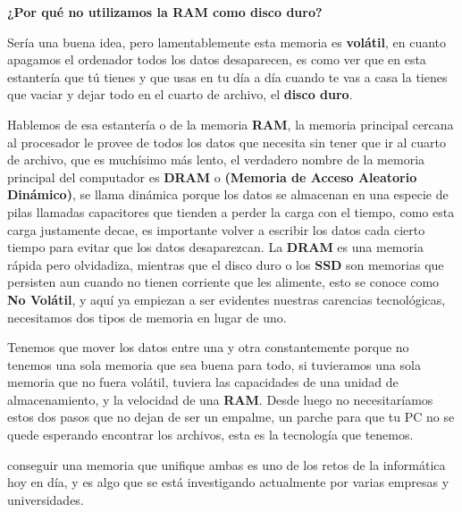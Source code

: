 \documentclass{article}
\begin{document}
\vspace{0.5cm}

\textbf{¿Por qué no utilizamos la RAM como disco duro?}

\vspace{0.5cm}

Sería una buena idea, pero lamentablemente esta memoria es \textbf{volátil}, en cuanto apagamos el ordenador todos los datos desaparecen, es como ver que en esta estantería que tú tienes y que usas en tu día a día cuando te vas a casa la tienes que vaciar y dejar todo en el cuarto de archivo, el \textbf{disco duro}.

\vspace{0.5cm}

Hablemos de esa estantería o de la memoria \textbf{RAM}, la memoria principal cercana al procesador le provee de todos los datos que necesita sin tener que ir al cuarto de archivo, que es muchísimo más lento, el verdadero nombre de la memoria principal del computador es \textbf{DRAM} o \textbf{(Memoria de Acceso Aleatorio Dinámico)}, se llama dinámica porque los datos se almacenan en una especie de pilas llamadas capacitores que tienden a perder la carga con el tiempo,\cite{uaslpwebsite} como esta carga justamente decae, es importante volver a escribir los datos cada cierto tiempo para evitar que los datos desaparezcan. La \textbf{DRAM} es una memoria rápida pero olvidadiza, mientras que el disco duro o los \textbf{SSD} son memorias que persisten aun cuando no tienen corriente que les alimente, esto se conoce como \textbf{No Volátil}, y aquí ya empiezan a ser evidentes nuestras carencias tecnológicas, necesitamos dos tipos de memoria en lugar de uno. 

\vspace{0.5cm}

Tenemos que mover los datos entre una y otra constantemente porque no tenemos una sola memoria que sea buena para todo, si tuvieramos una sola memoria que no fuera volátil, tuviera las capacidades de una unidad de almacenamiento, y la velocidad de una \textbf{RAM}. Desde luego no necesitaríamos estos dos pasos que no dejan de ser un empalme, un parche para que tu PC no se quede esperando encontrar los archivos, esta es la tecnología que tenemos.

\vspace{0.5cm}

conseguir una memoria que unifique ambas es uno de los retos de la informática hoy en día, y es algo que se está investigando actualmente por varias empresas y universidades.
\end{document}
